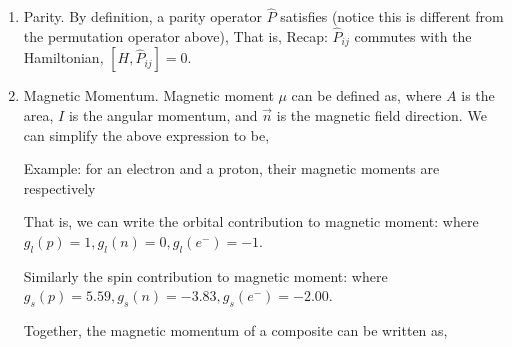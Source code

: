 \documentclass{school-22.101-notes}
\begin{document}
\begin{enumerate}
\item Parity. By definition, a parity operator $\hat{P}$ satisfies (notice this is different from the permutation operator above), 
That is, 
Recap: $\hat{P}_{ij}$ commutes with the Hamiltonian, $[H, \hat{P}_{ij}] = 0$. 

\item Magnetic Momentum. Magnetic moment $\mu$ can be defined as, 
where $A$ is the area, $I$ is the angular momentum, and $\vec{n}$ is the magnetic field direction. We can simplify the above expression to be, 

Example: for an electron and a proton, their magnetic moments are respectively

That is, we can write the orbital contribution to magnetic moment: 
where $g_l (p) = 1, g_l (n) = 0, g_l (e^-) = -1$. 

Similarly the spin contribution to magnetic moment: 
where $g_s(p) = 5.59, g_s(n) = -3.83, g_s(e^-) = -2.00$. 

Together, the magnetic momentum of a composite can be written as, 
\end{enumerate}
\end{document}
